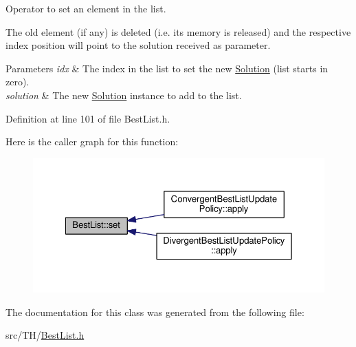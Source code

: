 Operator to set an element in the list. 

The old element (if any) is deleted (i.\+e. its memory is released) and the respective index position will point to the solution received as parameter.


\begin{DoxyParams}{Parameters}
{\em idx} & The index in the list to set the new \hyperlink{classSolution}{Solution} (list starts in zero). \\
\hline
{\em solution} & The new \hyperlink{classSolution}{Solution} instance to add to the list. \\
\hline
\end{DoxyParams}


Definition at line 101 of file Best\+List.\+h.



Here is the caller graph for this function\+:\nopagebreak
\begin{figure}[H]
\begin{center}
\leavevmode
\includegraphics[width=350pt]{classBestList_a4a5650fb72c71d6027540daa96de0d39_icgraph}
\end{center}
\end{figure}




The documentation for this class was generated from the following file\+:\begin{DoxyCompactItemize}
\item 
src/\+T\+H/\hyperlink{BestList_8h}{Best\+List.\+h}\end{DoxyCompactItemize}
